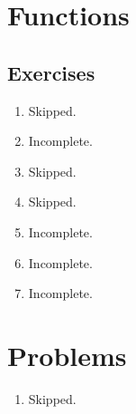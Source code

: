 \section{Functions}
\subsection*{Exercises}
\begin{enumerate}[\thesection-1]
%
\item Skipped.
%
\item Incomplete.
%
\item Skipped.
%
\item Skipped.
%
\item Incomplete.
%
\item Incomplete.
%
\item Incomplete.
%
\end{enumerate}

\section*{Problems}
\begin{enumerate}[\thechapter-1]
%
\item Skipped.
%
\end{enumerate}
